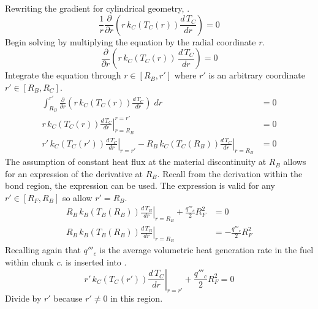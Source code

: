       Rewriting the gradient for cylindrical geometry,
      .
      \begin{equation}
        \label{eq:clad_conduction}
        \frac{1}{r} \frac{\partial}{\partial r} \left( r\, k_C(T_C(r)) 
          \frac{d\,T_C}{dr} \right) = 0
      \end{equation}
      Begin solving  by multiplying the equation by the
      radial coordinate $r$.
      \begin{equation}
        \frac{\partial}{\partial r} \left( r\,k_C(T_C(r))\,\frac{d\,T_C}{dr}
          \right) = 0
      \end{equation}
      Integrate the equation through $r \in [R_B,r']$ where $r'$ is an arbitrary
      coordinate $r' \in [R_B,R_C]$.
      \begin{align}
        \int_{R_B}^{r'} \frac{\partial}{\partial r} \left( r \, k_C(T_C(r))
          \frac{d\,T_C}{dr} \right) \; dr &= 0 \\
        \left. r\,k_C(T_C(r)) \frac{d\,T_C}{dr} \right|_{r=R_B}^{r=r'} &= 0 \\
        \label{eq:clad_before}
        \left. r' \, k_C(T_C(r')) \frac{d\,T_C}{dr} \right|_{r=r'} - 
          \left. R_B \, k_C(T_C(R_B)) \frac{d\,T_C}{dr} \right|_{r=R_B} &= 0
      \end{align}
      The assumption of constant heat flux at the material discontinuity at
      $R_B$ allows for an expression of the derivative at $R_B$. Recall from the
      derivation within the bond region, the expression 
      can be used. The expression is valid for any $r' \in [R_F,R_B]$ so allow
      $r'=R_B$.
      \begin{align}
        \left. R_B \, k_B(T_B(R_B)) \frac{d\,T_B}{dr} \right|_{r=R_B} +
          \frac{q'''_c}{2} R_F^2 &= 0 \\
        \label{eq:clad_bc_relation}
        \left. R_B \, k_B(T_B(R_B)) \frac{d\,T_B}{dr} \right|_{r=R_B} &= 
          - \frac{q'''_c}{2} R_F^2
      \end{align}
      Recalling again that $q'''_c$ is the average volumetric heat generation
      rate in the fuel within chunk $c$.  is
      inserted into .
      \begin{equation}
        \left. r' \, k_C(T_C(r')) \frac{d\,T_C}{dr} \right|_{r=r'} + 
          \frac{q'''_c}{2} R_F^2 = 0
      \end{equation}
      Divide by $r'$ because $r' \ne 0$ in this region.
